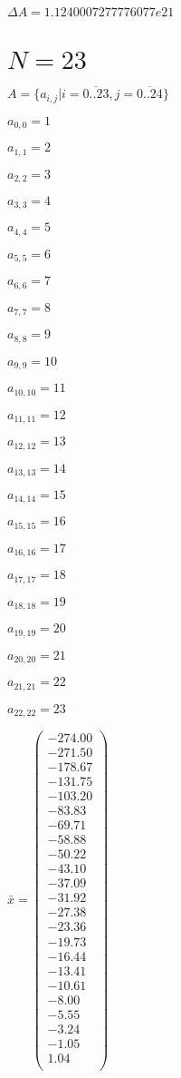 \documentclass[a4paper,12pt]{article}
\begin{document}
$\Delta A = 1.1240007277776077e21$



\section{ $N = 23$ }
$A = \{ a _{ i, j } | i = \overline { 0..23 }, j = \overline { 0..24 } \}$

$a _{ 0, 0 } = 1$

$a _{ 1, 1 } = 2$

$a _{ 2, 2 } = 3$

$a _{ 3, 3 } = 4$

$a _{ 4, 4 } = 5$

$a _{ 5, 5 } = 6$

$a _{ 6, 6 } = 7$

$a _{ 7, 7 } = 8$

$a _{ 8, 8 } = 9$

$a _{ 9, 9 } = 10$

$a _{ 10, 10 } = 11$

$a _{ 11, 11 } = 12$

$a _{ 12, 12 } = 13$

$a _{ 13, 13 } = 14$

$a _{ 14, 14 } = 15$

$a _{ 15, 15 } = 16$

$a _{ 16, 16 } = 17$

$a _{ 17, 17 } = 18$

$a _{ 18, 18 } = 19$

$a _{ 19, 19 } = 20$

$a _{ 20, 20 } = 21$

$a _{ 21, 21 } = 22$

$a _{ 22, 22 } = 23$

$\bar { x } = \begin{pmatrix}
-274.00 \\
-271.50 \\
-178.67 \\
-131.75 \\
-103.20 \\
-83.83 \\
-69.71 \\
-58.88 \\
-50.22 \\
-43.10 \\
-37.09 \\
-31.92 \\
-27.38 \\
-23.36 \\
-19.73 \\
-16.44 \\
-13.41 \\
-10.61 \\
-8.00 \\
-5.55 \\
-3.24 \\
-1.05 \\
1.04 \\
\end{pmatrix}
$
\end{document}
